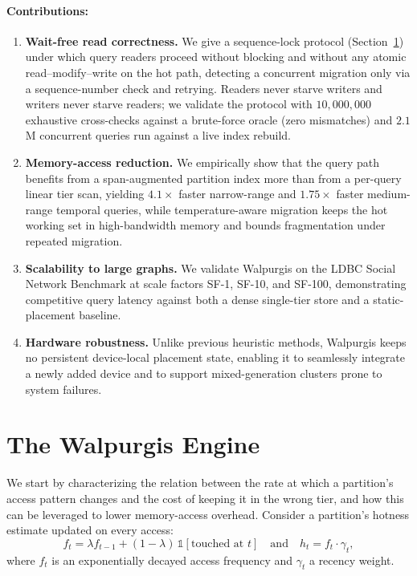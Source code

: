 \documentclass{article}
\begin{document}
\paragraph{Contributions:}
\begin{enumerate}
    \item \textbf{Wait-free read correctness.} We give a sequence-lock protocol
    (Section~\ref{sec:system}) under which query readers proceed without blocking and
    without any atomic read--modify--write on the hot path, detecting a concurrent
    migration only via a sequence-number check and retrying. Readers never starve
    writers and writers never starve readers; we validate the protocol with
    $10{,}000{,}000$ exhaustive cross-checks against a brute-force oracle (zero
    mismatches) and $2.1$M concurrent queries run against a live index rebuild.

    \item \textbf{Memory-access reduction.} We empirically show that the query path
    benefits from a span-augmented partition index more than from a per-query linear
    tier scan, yielding $4.1\times$ faster narrow-range and $1.75\times$ faster
    medium-range temporal queries, while temperature-aware migration keeps the hot
    working set in high-bandwidth memory and bounds fragmentation under repeated
    migration.

    \item \textbf{Scalability to large graphs.} We validate Walpurgis on the LDBC
    Social Network Benchmark at scale factors SF-1, SF-10, and SF-100, demonstrating
    competitive query latency against both a dense single-tier store and a
    static-placement baseline.

    \item \textbf{Hardware robustness.} Unlike previous heuristic methods, Walpurgis
    keeps no persistent device-local placement state, enabling it to seamlessly
    integrate a newly added device and to support mixed-generation clusters prone to
    system failures.
\end{enumerate}

\section{The Walpurgis Engine}
\label{sec:system}

We start by characterizing the relation between the rate at which a partition's access
pattern changes and the cost of keeping it in the wrong tier, and how this can be
leveraged to lower memory-access overhead. Consider a partition's hotness estimate
updated on every access:
\begin{equation}
f_t = \lambda f_{t-1} + (1 - \lambda)\,\mathbb{1}[\text{touched at } t]
\quad \text{and} \quad
h_t = f_t \cdot \gamma_t,
\label{eq:hotness}
\end{equation}
where $f_t$ is an exponentially decayed access frequency and $\gamma_t$ a recency
weight.
\end{document}
